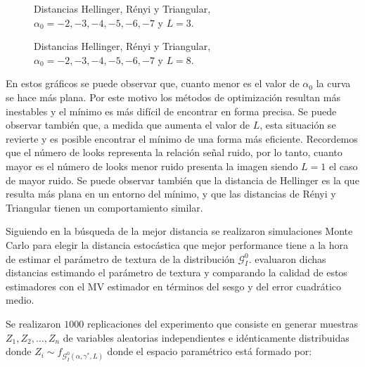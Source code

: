 \begin{figure}[h!]
	\centering    
	\caption{\label{DistL3}\small Distancias Hellinger, Rényi y Triangular, $\alpha_0= -2,-3,-4,-5,-6,-7$ y $L=3$.}
\end{figure}

\begin{figure}[h!]
	\centering    
	\caption{\label{DistL8}\small Distancias Hellinger, Rényi y Triangular, $\alpha_0= -2,-3,-4,-5,-6,-7$ y $L=8$.}
\end{figure}

En estos gráficos se puede observar que, cuanto menor es el valor de $\alpha_0$ la curva se hace más plana. Por este motivo los métodos de optimización resultan más inestables y el mínimo es más difícil de encontrar en forma precisa. Se puede observar también que, a medida que aumenta el valor de $L$, esta situación se revierte y es posible encontrar el mínimo de una forma más eficiente. Recordemos que el número de looks representa la relación señal ruido, por lo tanto, cuanto mayor es el número de looks menor ruido presenta la imagen siendo $L=1$ el caso de mayor ruido. Se puede observar también que la distancia de Hellinger es la que resulta más plana en un entorno del mínimo, y que las distancias de Rényi y Triangular tienen un comportamiento similar.

Siguiendo en la búsqueda de la mejor distancia se realizaron simulaciones Monte Carlo para elegir la distancia estocástica que mejor performance tiene a la hora de estimar el parámetro de textura de la distribución $\mathcal{G}_I^0$. \citet{cassettiast2013} evaluaron dichas distancias estimando el parámetro de textura y  comparando la calidad de estos estimadores con el MV estimador en términos del sesgo y del error cuadrático medio. 

Se realizaron $1000$ replicaciones del experimento que consiste en generar muestras $Z_1, Z_2,\ldots,Z_n$ de variables aleatorias independientes e idénticamente distribuidas donde $Z_i \sim f_{\mathcal{G}_I^0(\alpha,\gamma^*,L)}$ donde el espacio paramétrico está formado por:

